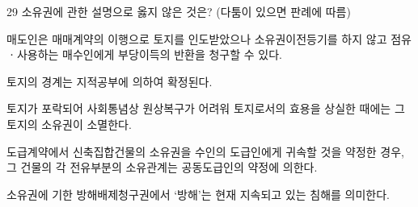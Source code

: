 \begin{question}{29}
소유권에 관한 설명으로 옳지 않은 것은? (다툼이 있으면 판례에 따름)
\begin{choices}
  \item 매도인은 매매계약의 이행으로 토지를 인도받았으나 소유권이전등기를 하지 않고 점유ㆍ사용하는 매수인에게 부당이득의 반환을 청구할 수 있다.
  \item 토지의 경계는 지적공부에 의하여 확정된다.
  \item 토지가 포락되어 사회통념상 원상복구가 어려워 토지로서의 효용을 상실한 때에는 그 토지의 소유권이 소멸한다.
  \item 도급계약에서 신축집합건물의 소유권을 수인의 도급인에게 귀속할 것을 약정한 경우, 그 건물의 각 전유부분의 소유관계는 공동도급인의 약정에 의한다.
  \item 소유권에 기한 방해배제청구권에서 ‘방해’는 현재 지속되고 있는 침해를 의미한다.
\end{choices}
\end{question}
